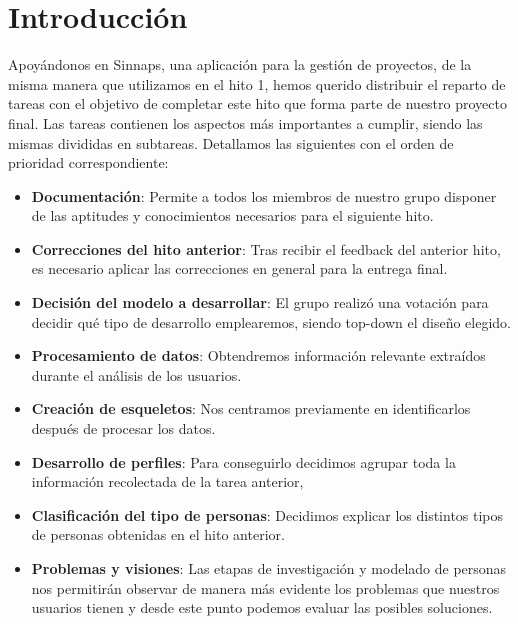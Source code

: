 \documentclass[12pt]{article}
\begin{document}
\section{Introducción}
Apoyándonos en Sinnaps, una aplicación para la gestión de proyectos, de la misma manera que utilizamos en el hito 1, hemos querido distribuir el reparto de tareas con el objetivo de completar este hito que forma parte de nuestro proyecto final. Las tareas contienen los aspectos más importantes a cumplir, siendo las mismas divididas en subtareas. Detallamos las siguientes con el orden de prioridad correspondiente:

\begin{itemize}

\item \textbf{Documentación}: Permite a todos los miembros de nuestro grupo disponer de las aptitudes y conocimientos necesarios para el siguiente hito.

\item \textbf{Correcciones del hito anterior}: Tras recibir el feedback del anterior hito, es
necesario aplicar las correcciones en general para la entrega final.

\item \textbf{Decisión del modelo a desarrollar}​: El grupo realizó una votación para decidir qué tipo de desarrollo emplearemos, siendo top-down el diseño elegido.

\item \textbf{Procesamiento de datos}: Obtendremos información relevante extraídos durante el análisis de los usuarios.

\item \textbf{Creación de esqueletos}: Nos centramos previamente en identificarlos después de procesar los datos.

\item \textbf{Desarrollo de perfiles}: Para conseguirlo decidimos agrupar toda la información recolectada
de la tarea anterior,

\item \textbf{Clasificación del tipo de personas}​: Decidimos explicar los distintos tipos de personas obtenidas en el hito anterior.


\item \textbf{Problemas y visiones}​: Las etapas de investigación y modelado de personas nos permitirán observar de manera más evidente los problemas que nuestros usuarios tienen y desde este punto podemos evaluar las posibles soluciones.


\end{itemize}
\end{document}
